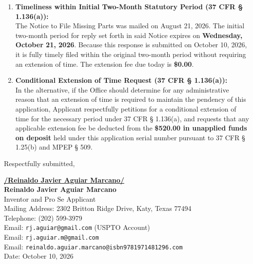 \documentclass[11pt,letterpaper]{article}
\begin{document}
\begin{enumerate}[leftmargin=*]
    \item \textbf{Timeliness within Initial Two-Month Statutory Period (37 CFR \S{} 1.136(a)):} \\
    The Notice to File Missing Parts was mailed on August 21, 2026. The initial two-month period for reply set forth in said Notice expires on \textbf{Wednesday, October 21, 2026}. Because this response is submitted on October 10, 2026, it is fully timely filed within the original two-month period without requiring an extension of time. The extension fee due today is \textbf{\$0.00}.

    \item \textbf{Conditional Extension of Time Request (37 CFR \S{} 1.136(a)):} \\
    In the alternative, if the Office should determine for any administrative reason that an extension of time is required to maintain the pendency of this application, Applicant respectfully petitions for a conditional extension of time for the necessary period under 37 CFR \S{} 1.136(a), and requests that any applicable extension fee be deducted from the \textbf{\$520.00 in unapplied funds on deposit} held under this application serial number pursuant to 37 CFR \S{} 1.25(b) and MPEP \S{} 509.
\end{enumerate}

\vspace{0.6cm}
\begin{singlespace}
\noindent Respectfully submitted, \par\vspace{0.8cm}
\underline{\textbf{/Reinaldo Javier Aguiar Marcano/}} \\
\textbf{Reinaldo Javier Aguiar Marcano} \\
Inventor and Pro Se Applicant \\
Mailing Address: 2302 Britton Ridge Drive, Katy, Texas 77494 \\
Telephone: (202) 599-3979 \\
Email: \texttt{rj.aguiar@gmail.com} (USPTO Account) \\
Email: \texttt{rj.aguiar.m@gmail.com} \\
Email: \texttt{reinaldo.aguiar.marcano@isbn9781971481296.com} \\
Date: October 10, 2026
\end{singlespace}
\end{document}

